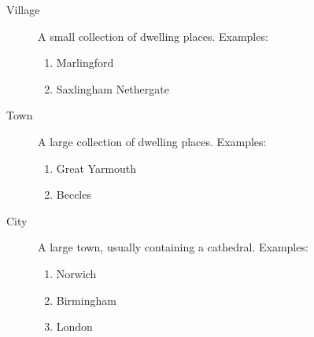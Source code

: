 \documentclass[12pt]{scrartcl}
\begin{document}
\begin{description}

  \item[Village] A small collection of dwelling places.  Examples:
    \begin{enumerate}

      \item Marlingford

      \item Saxlingham Nethergate

    \end{enumerate}

  \item[Town] A large collection of dwelling places.  Examples:
    \begin{enumerate}

      \item Great Yarmouth

      \item Beccles

    \end{enumerate}

  \item[City] A large town, usually containing a cathedral.  Examples:
    \begin{enumerate}

      \item Norwich

      \item Birmingham

      \item London

    \end{enumerate}

\end{description}
\end{document}
